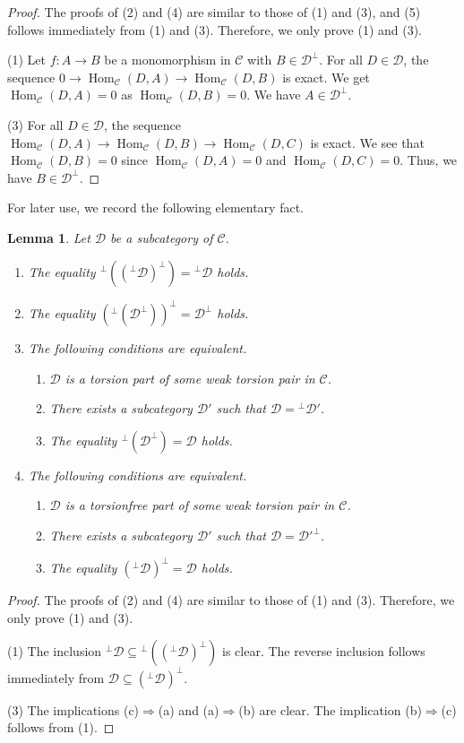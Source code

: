 \documentclass{amsart}
\newtheorem{lem}[thm]{Lemma}
\theoremstyle{definition}
\theoremstyle{remark}
\def\C{\mathcal{C}}
\def\D{\mathcal{D}}
\def\Hom{\operatorname{Hom}}
\begin{document}
\begin{proof}
The proofs of (2) and (4) are similar to those of (1) and (3), and (5) follows immediately from (1) and (3). Therefore, we only prove (1) and (3).

(1) Let $f:A\to B$ be a monomorphism in $\C$ with $B\in\D^\perp$. For all $D\in\D$, the sequence $0\to\Hom_\C(D,A)\to\Hom_\C(D,B)$ is exact. We get $\Hom_\C(D,A)=0$ as $\Hom_\C(D,B)=0$. We have $A\in\D^\perp$.

(3) For all $D\in\D$, the sequence $\Hom_\C(D,A)\to\Hom_\C(D,B)\to\Hom_\C(D,C)$ is exact. We see that $\Hom_\C(D,B)=0$ since $\Hom_\C(D,A)=0$ and $\Hom_\C(D,C)=0$. Thus, we have $B\in\D^\perp$.
\end{proof}

For later use, we record the following elementary fact.

\begin{lem}\label{formula perp}
Let $\D$ be a subcategory of $\C$.
\begin{enumerate}[\rm(1)]
\item 
The equality $^\perp((^\perp\D)^\perp)={}^\perp\D$ holds.
\item 
The equality $(^\perp(\D^\perp))^\perp=\D^\perp$ holds.
\item 
The following conditions are equivalent.
\begin{enumerate}[\rm(a)]
\item 
$\D$ is a torsion part of some weak torsion pair in $\C$.
\item 
There exists a subcategory $\D'$ such that $\D={}^\perp\D'$.
\item 
The equality $^\perp(\D^\perp)=\D$ holds.
\end{enumerate}
\item 
The following conditions are equivalent.
\begin{enumerate}[\rm(a)]
\item 
$\D$ is a torsionfree part of some weak torsion pair in $\C$.
\item 
There exists a subcategory $\D'$ such that $\D=\D'^\perp$.
\item 
The equality $(^\perp\D)^\perp=\D$ holds.
\end{enumerate}
\end{enumerate}
\end{lem}

\begin{proof}
The proofs of (2) and (4) are similar to those of (1) and (3). Therefore, we only prove (1) and (3).

(1) The inclusion $^\perp\D\subseteq{}^\perp((^\perp\D)^\perp)$ is clear. The reverse inclusion follows immediately from $\D\subseteq(^\perp\D)^\perp$.

(3) The implications (c)$\Rightarrow$(a) and (a)$\Rightarrow$(b) are clear. The implication (b)$\Rightarrow$(c) follows from (1).
\end{proof}
\end{document}
